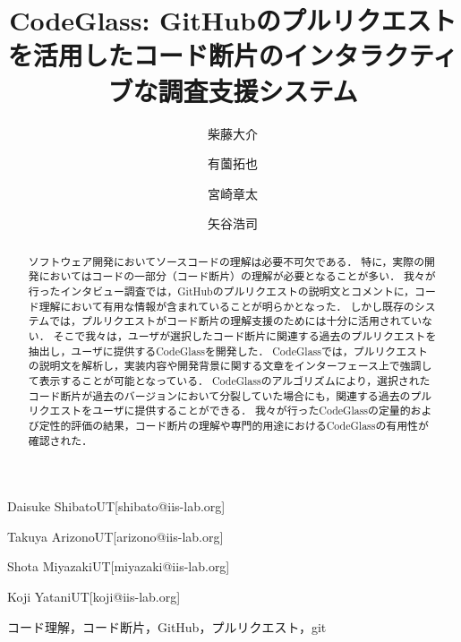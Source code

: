 \documentclass[submit,techrep,noauthor]{ipsj}
\begin{document}
\title{CodeGlass: GitHubのプルリクエストを活用したコード断片のインタラクティブな調査支援システム}





\author{柴藤大介}{Daisuke Shibato}{UT}[shibato@iis-lab.org]
\author{有薗拓也}{Takuya Arizono}{UT}[arizono@iis-lab.org]
\author{宮崎章太}{Shota Miyazaki}{UT}[miyazaki@iis-lab.org]
\author{矢谷浩司}{Koji Yatani}{UT}[koji@iis-lab.org]

\begin{abstract}
ソフトウェア開発においてソースコードの理解は必要不可欠である．
特に，実際の開発においてはコードの一部分（コード断片）の理解が必要となることが多い．
我々が行ったインタビュー調査では，GitHubのプルリクエストの説明文とコメントに，コード理解において有用な情報が含まれていることが明らかとなった．
しかし既存のシステムでは，プルリクエストがコード断片の理解支援のためには十分に活用されていない．
そこで我々は，ユーザが選択したコード断片に関連する過去のプルリクエストを抽出し，ユーザに提供するCodeGlassを開発した．
CodeGlassでは，プルリクエストの説明文を解析し，実装内容や開発背景に関する文章をインターフェース上で強調して表示することが可能となっている．
CodeGlassのアルゴリズムにより，選択されたコード断片が過去のバージョンにおいて分裂していた場合にも，関連する過去のプルリクエストをユーザに提供することができる．
我々が行ったCodeGlassの定量的および定性的評価の結果，コード断片の理解や専門的用途におけるCodeGlassの有用性が確認された．
\end{abstract}


\begin{jkeyword}
コード理解，コード断片，GitHub，プルリクエスト，git
\end{jkeyword}
\end{document}
